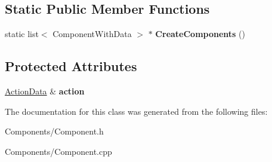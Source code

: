 \subsection*{\-Static \-Public \-Member \-Functions}
\begin{DoxyCompactItemize}
\item 
\hypertarget{class_component_a5fee0e84519c7bf66e0a4a746188d1a3}{
static list$<$ \-Component\-With\-Data $>$ $\ast$ {\bfseries \-Create\-Components} ()}
\label{class_component_a5fee0e84519c7bf66e0a4a746188d1a3}

\end{DoxyCompactItemize}
\subsection*{\-Protected \-Attributes}
\begin{DoxyCompactItemize}
\item 
\hypertarget{class_component_a479e7e36748bf2c7c37abeea1fac9493}{
\hyperlink{class_action_data}{\-Action\-Data} \& {\bfseries action}}
\label{class_component_a479e7e36748bf2c7c37abeea1fac9493}

\end{DoxyCompactItemize}


\-The documentation for this class was generated from the following files\-:\begin{DoxyCompactItemize}
\item 
\-Components/\-Component.\-h\item 
\-Components/\-Component.\-cpp\end{DoxyCompactItemize}
